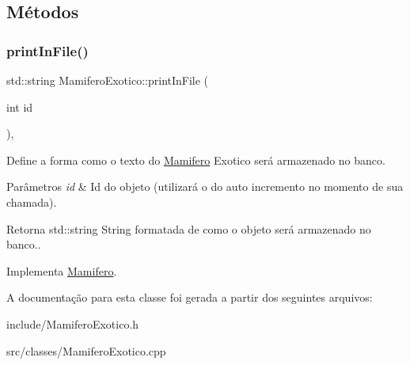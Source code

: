 \subsection{Métodos}
\mbox{\label{classMamiferoExotico_a4ee6f5f4a2917cfdf54304525add0c4a}} 
\subsubsection{\texorpdfstring{print\+In\+File()}{printInFile()}}
{\footnotesize\ttfamily std\+::string Mamifero\+Exotico\+::print\+In\+File (\begin{DoxyParamCaption}\item[{int}]{id }\end{DoxyParamCaption})\hspace{0.3cm}{\ttfamily [protected]}, {\ttfamily [virtual]}}



Define a forma como o texto do \hyperlink{classMamifero}{Mamifero} Exotico será armazenado no banco. 


\begin{DoxyParams}{Parâmetros}
{\em id} & Id do objeto (utilizará o do auto incremento no momento de sua chamada). \\
\hline
\end{DoxyParams}
\begin{DoxyReturn}{Retorna}
std\+::string String formatada de como o objeto será armazenado no banco.. 
\end{DoxyReturn}


Implementa \hyperlink{classMamifero_ae91b67a8f0f508793a801aadcaa18570}{Mamifero}.



A documentação para esta classe foi gerada a partir dos seguintes arquivos\+:\begin{DoxyCompactItemize}
\item 
include/Mamifero\+Exotico.\+h\item 
src/classes/Mamifero\+Exotico.\+cpp\end{DoxyCompactItemize}
